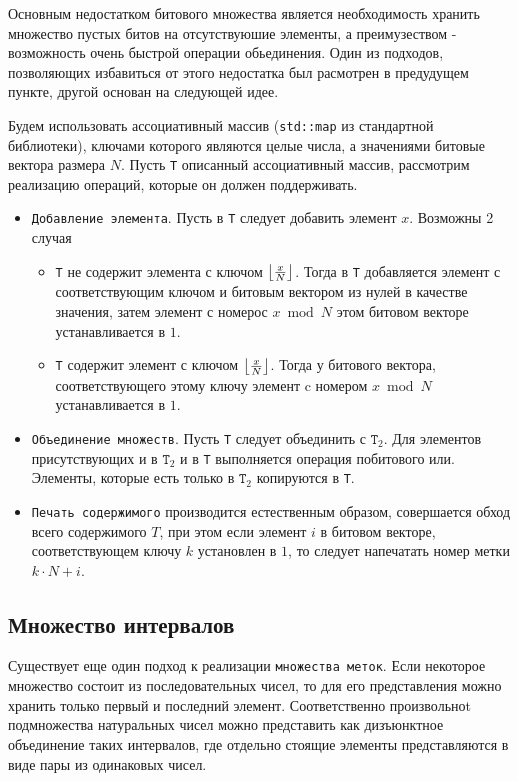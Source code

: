 Основным недостатком битового множества является необходимость хранить множество пустых битов на отсутствуюшие элементы, а преимузеством - возможность очень быстрой операции обьединения. Один из подходов, позволяющих избавиться от этого недостатка был расмотрен в предудущем пункте, другой основан на следующей идее.

Будем использовать ассоциативный массив (\texttt{std::map} из стандартной библиотеки), ключами которого являются целые числа, а значениями битовые вектора размера $N$. Пусть \texttt{T} описанный ассоциативный массив, рассмотрим реализацию операций, которые он должен поддерживать.


\begin{itemize}
    \item \texttt{Добавление элемента}. Пусть в \texttt{T} следует добавить элемент $x$. Возможны 2 случая
    \begin{itemize}
        \item \texttt{T} не содержит элемента с ключом $\floor*{\frac{x}{N}}$. Тогда в \texttt{T} добавляется элемент с соответствующим ключом и битовым вектором из нулей в качестве значения, затем элемент с номерос $x \bmod N$ этом битовом векторе устанавливается в $1$.
        \item \texttt{T} содержит элемент с ключом $\floor*{\frac{x}{N}}$. Тогда у битового вектора, соответствующего этому ключу элемент c номером $x \bmod N$ устанавливается в $1$.
    \end{itemize}
    \item \texttt{Объединение множеств}. Пусть \texttt{T} следует объединить с $\texttt{T}_2$. Для элементов присутствующих и в $\texttt{T}_2$ и в \texttt{T} выполняется операция побитового или. Элементы, которые есть только в $\texttt{T}_2$ копируются в \texttt{T}.
    \item \texttt{Печать содержимого} производится естественным образом, совершается обход всего содержимого $T$, при этом если элемент $i$ в битовом векторе, соответствующем ключу $k$ установлен в $1$, то следует напечатать номер метки $k \cdot N + i$.
\end{itemize}

\subsection{Множество интервалов}

Существует еще один подход к реализации \texttt{множества меток}. Если некоторое множество состоит из последовательных чисел, то для его представления можно хранить только первый и последний элемент. Соответственно произвольноt подмножества натуральных чисел можно представить как дизъюнктное объединение таких интервалов, где отдельно стоящие элементы представляются в виде пары из одинаковых чисел.

